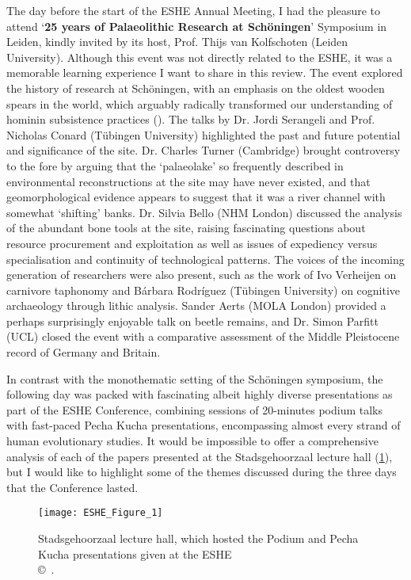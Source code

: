 The day before the start of the ESHE Annual Meeting, I had the pleasure to attend ‘\textbf{25 years of Palaeolithic Research at Schöningen}’ Symposium in Leiden, kindly invited by its host, Prof. Thijs van Kolfschoten (Leiden University). Although this event was not directly related to the ESHE, it was a memorable learning experience I want to share in this review. The event explored the history of research at Schöningen, with an emphasis on the oldest wooden spears in the world, which arguably radically transformed our understanding of hominin subsistence practices (\cite[][]{thieme}).
The talks by Dr. Jordi Serangeli and Prof. Nicholas Conard (Tübingen University) highlighted the past and future potential and significance of the site. Dr. Charles Turner (Cambridge) brought controversy to the fore by arguing that the ‘palaeolake’ so frequently described in environmental reconstructions at the site may have never existed, and that geomorphological evidence appears to suggest that it was a river channel with somewhat ‘shifting’ banks. Dr. Silvia Bello (NHM London) discussed the analysis of the abundant bone tools at the site, raising fascinating questions about resource procurement and exploitation as well as issues of expediency versus specialisation and continuity of technological patterns. The voices of the incoming generation of researchers were also present, such as the work of Ivo Verheijen on carnivore taphonomy and Bárbara Rodríguez (Tübingen University) on cognitive archaeology through lithic analysis. Sander Aerts (MOLA London) provided a perhaps surprisingly enjoyable talk on beetle remains, and Dr. Simon Parfitt (UCL) closed the event with a comparative assessment of the Middle Pleistocene record of Germany and Britain.

In contrast with the monothematic setting of the Schöningen symposium, the following day was packed with fascinating albeit highly diverse presentations as part of the ESHE Conference, combining sessions of 20-minutes podium talks with fast-paced Pecha Kucha presentations, encompassing almost every strand of human evolutionary studies. It would be impossible to offer a comprehensive analysis of each of the papers presented at the Stadsgehoorzaal lecture hall (\cref{fig:ESHE_Figure_1}), but I would like to highlight some of the themes discussed during the three days that the Conference lasted.

\begin{figure}[!tb]
	\texttt{[image: ESHE\_Figure\_1]}
	\caption{Stadsgehoorzaal lecture hall, which hosted the Podium and Pecha Kucha presentations given at the ESHE
		{\normalfont\scriptsize \\ \copyright\
			\shortauthor.
	}}
	\label{fig:ESHE_Figure_1}
\end{figure}


